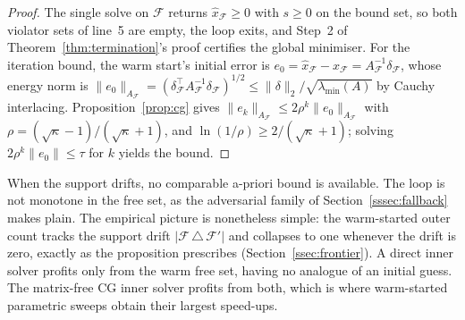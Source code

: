 \begin{proof}
The single solve on $\mathcal{F}$ returns $\hat x_{\mathcal{F}} \geq 0$ with $s \geq 0$ on the
bound set, so both violator sets of line~5 are empty, the loop exits, and Step~2 of
Theorem~\ref{thm:termination}'s proof certifies the global minimiser. For the iteration
bound, the warm start's initial error is
$e_0 = \hat x_{\mathcal{F}} - x_{\mathcal{F}} = A_{\mathcal{F}}^{-1}\delta_{\mathcal{F}}$,
whose energy norm is
$\lVert e_0 \rVert_{A_{\mathcal{F}}} = (\delta_{\mathcal{F}}^\top A_{\mathcal{F}}^{-1}
\delta_{\mathcal{F}})^{1/2} \leq \lVert\delta\rVert_2 / \sqrt{\lambda_{\min}(A)}$ by Cauchy
interlacing. Proposition~\ref{prop:cg} gives
$\lVert e_k \rVert_{A_{\mathcal{F}}} \leq 2\rho^k \lVert e_0 \rVert_{A_{\mathcal{F}}}$ with
$\rho = (\sqrt\kappa - 1)/(\sqrt\kappa + 1)$, and
$\ln(1/\rho) \geq 2/(\sqrt\kappa + 1)$; solving $2\rho^k\lVert e_0\rVert \leq \tau$ for $k$
yields the bound.
\end{proof}

When the support drifts, no comparable a-priori bound is available. The loop is not
monotone in the free set, as the adversarial family of Section~\ref{sssec:fallback} makes
plain. The empirical picture is nonetheless simple: the warm-started outer count tracks the
support drift $|\mathcal{F} \,\triangle\, \mathcal{F}'|$ and collapses to one whenever the
drift is zero, exactly as the proposition prescribes (Section~\ref{ssec:frontier}). A direct
inner solver profits only from the warm free set, having no analogue of an initial guess. The
matrix-free CG inner solver profits from both, which is where warm-started parametric sweeps
obtain their largest speed-ups.
